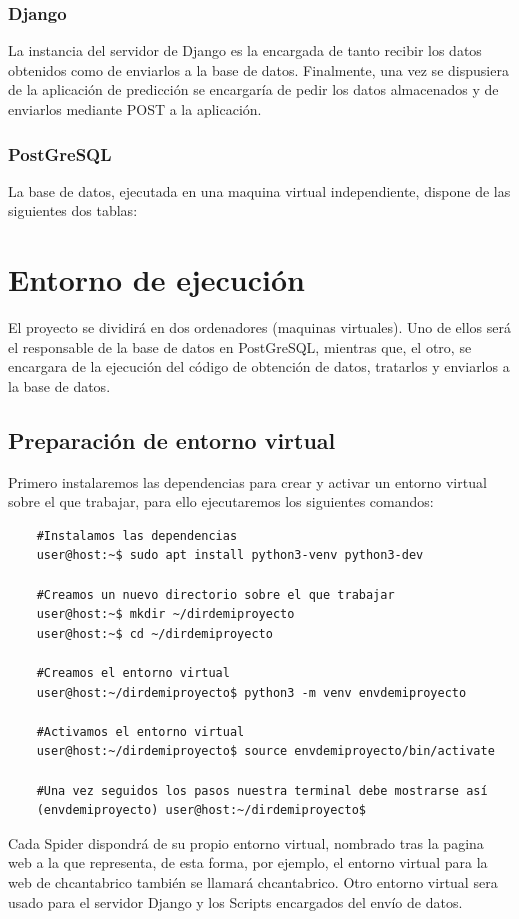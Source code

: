 \subsubsection{Django}
La instancia del servidor de Django es la encargada de tanto recibir los datos obtenidos como de enviarlos a la base de datos. Finalmente, una vez se dispusiera de la aplicación de predicción se encargaría de pedir los datos almacenados y de enviarlos mediante POST a la aplicación.

\subsubsection{PostGreSQL}
La base de datos, ejecutada en una maquina virtual independiente, dispone de las siguientes dos tablas:

\section{Entorno de ejecución}
El proyecto se dividirá en dos ordenadores (maquinas virtuales). Uno de ellos será el responsable de la base de datos en PostGreSQL, mientras que, el otro, se encargara de la ejecución del código de obtención de datos, tratarlos y enviarlos a la base de datos.

\subsection{Preparación de entorno virtual}
Primero instalaremos las dependencias para crear y activar un entorno virtual sobre el que trabajar, para ello ejecutaremos los siguientes comandos:

\begin{verbatim}
	#Instalamos las dependencias
	user@host:~$ sudo apt install python3-venv python3-dev
	
	#Creamos un nuevo directorio sobre el que trabajar
	user@host:~$ mkdir ~/dirdemiproyecto
	user@host:~$ cd ~/dirdemiproyecto
	
	#Creamos el entorno virtual
	user@host:~/dirdemiproyecto$ python3 -m venv envdemiproyecto
	
	#Activamos el entorno virtual
	user@host:~/dirdemiproyecto$ source envdemiproyecto/bin/activate
	
	#Una vez seguidos los pasos nuestra terminal debe mostrarse así
	(envdemiproyecto) user@host:~/dirdemiproyecto$
\end{verbatim}

Cada Spider dispondrá de su propio entorno virtual, nombrado tras la pagina web a la que representa, de esta forma, por ejemplo, el entorno virtual para la web de chcantabrico también se llamará chcantabrico.
Otro entorno virtual sera usado para el servidor Django y los Scripts encargados del envío de datos.

